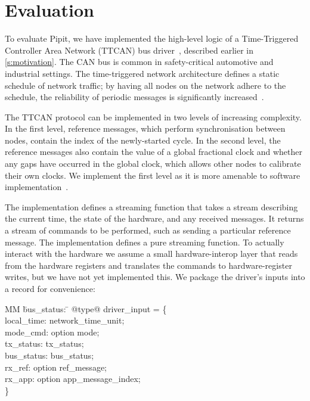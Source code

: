 
\section{Evaluation}
\label{s:evaluation}

To evaluate Pipit, we have implemented the high-level logic of a Time-Triggered Controller Area Network (TTCAN) bus driver~\cite{ISO11898_4}, described earlier in \autoref{s:motivation}.
The CAN bus is common in safety-critical automotive and industrial settings.
The time-triggered network architecture defines a static schedule of network traffic;
by having all nodes on the network adhere to the schedule, the reliability of periodic messages is significantly increased~\cite{fuehrer2001time}.

The TTCAN protocol can be implemented in two levels of increasing complexity.
In the first level, reference messages, which perform synchronisation between nodes, contain the index of the newly-started cycle.
In the second level, the reference messages also contain the value of a global fractional clock and whether any gaps have occurred in the global clock, which allows other nodes to calibrate their own clocks.
We implement the first level as it is more amenable to software implementation~\cite{hartwich2002integration}.

The implementation defines a streaming function that takes a stream describing the current time, the state of the hardware, and any received messages.
It returns a stream of commands to be performed, such as sending a particular reference message.
The implementation defines a pure streaming function.
To actually interact with the hardware we assume a small hardware-interop layer that reads from the hardware registers and translates the commands to hardware-register writes, but we have not yet implemented this.
We package the driver's inputs into a record for convenience:

\begin{tabbing}
  MM \= bus_status: \= \kill
  @type@ driver_input = \{ \\
    \> local_time: \> network_time_unit; \\
    \> mode_cmd: \> option mode; \\
    \> tx_status: \> tx_status; \\
    \> bus_status: \> bus_status; \\
    \> rx_ref: \> option ref_message; \\
    \> rx_app: \> option app_message_index; \\
    \}
\end{tabbing}


